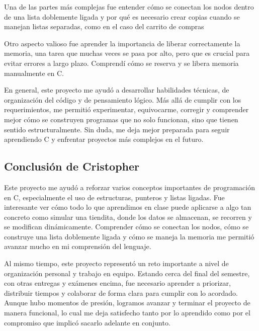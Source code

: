 \documentclass{article}
\begin{document}
Una de las partes más complejas fue entender cómo se conectan los nodos dentro de una lista doblemente ligada y por qué es necesario crear copias cuando se manejan listas separadas, como en el caso del carrito de compras

Otro aspecto valioso fue aprender la importancia de liberar correctamente la memoria, una tarea que muchas veces se pasa por alto, pero que es crucial para evitar errores a largo plazo. Comprendí cómo se reserva y se libera memoria manualmente en C.

En general, este proyecto me ayudó a desarrollar habilidades técnicas, de organización del código y de pensamiento lógico. Más allá de cumplir con los requerimientos, me permitió experimentar, equivocarme, corregir y comprender mejor cómo se construyen programas que no solo funcionan, sino que tienen sentido estructuralmente. Sin duda, me deja mejor preparada para seguir aprendiendo C y enfrentar proyectos más complejos en el futuro.

\subsection{Conclusión de Cristopher}

Este proyecto me ayudó a reforzar varios conceptos importantes de programación en C, especialmente el uso de estructuras, punteros y listas ligadas. Fue interesante ver cómo todo lo que aprendimos en clase puede aplicarse a algo tan concreto como simular una tiendita, donde los datos se almacenan, se recorren y se modifican dinámicamente. Comprender cómo se conectan los nodos, cómo se construye una lista doblemente ligada y cómo se maneja la memoria me permitió avanzar mucho en mi comprensión del lenguaje.

Al mismo tiempo, este proyecto representó un reto importante a nivel de organización personal y trabajo en equipo. Estando cerca del final del semestre, con otras entregas y exámenes encima, fue necesario aprender a priorizar, distribuir tiempos y colaborar de forma clara para cumplir con lo acordado. Aunque hubo momentos de presión, logramos avanzar y terminar el proyecto de manera funcional, lo cual me deja satisfecho tanto por lo aprendido como por el compromiso que implicó sacarlo adelante en conjunto.
\end{document}
